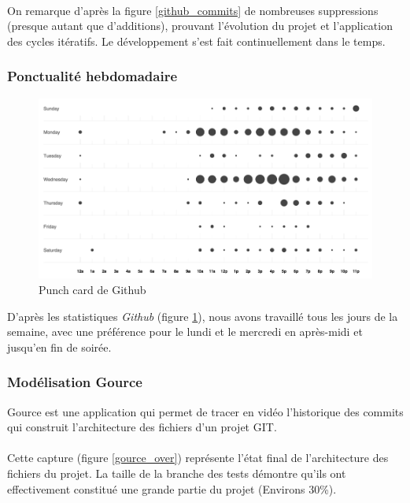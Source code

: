 \paragraph{}
On remarque d'après la figure \ref{github_commits} de nombreuses suppressions (presque autant que d’additions), prouvant l’évolution du projet et l’application des cycles itératifs. Le développement s’est fait continuellement dans le temps.
 
\subsubsection{Ponctualité hebdomadaire}
 
\begin{figure}[H]\centering
  \includegraphics[scale=.8]{./img/punchcard.png}
  \caption{Punch card de Github}
  \label{punchcard}
\end{figure}
 
D’après les statistiques \emph{Github} (figure \ref{punchcard}), nous avons travaillé tous les jours de la semaine, avec une préférence pour le lundi et le mercredi en après-midi et jusqu’en fin de soirée.
 
 
\subsubsection{Modélisation Gource}
 
Gource est une application qui permet de tracer en vidéo l’historique des commits qui construit l’architecture des fichiers d’un projet GIT.
 
\paragraph{}
Cette capture (figure \ref{gource_over}) représente l’état final de l’architecture des fichiers du projet. La taille de la branche des tests démontre qu'ils ont effectivement constitué une grande partie du projet (Environs 30\%).
 
